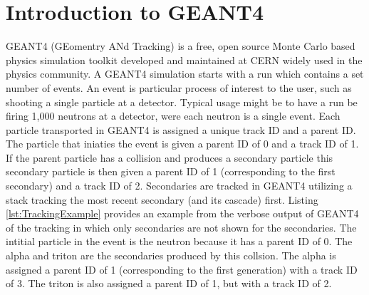 \section{Introduction to GEANT4}
\label{sec:G4Intro}

GEANT4 (GEomentry ANd Tracking) is a free, open source Monte Carlo based physics simulation toolkit developed and maintained at CERN widely used in the physics community.
A GEANT4 simulation starts with a run which contains a set number of events.
An event is particular process of interest to the user, such as shooting a single particle at a detector. 
Typical usage might be to have a run be firing 1,000 neutrons at a detector, were each neutron is a single event.
Each particle transported in GEANT4 is assigned a unique track ID and a parent ID.
The particle that iniaties the event is given a parent ID of 0 and a track ID of 1.
If the parent particle has a collision and produces a secondary particle this secondary particle is then given a parent ID of 1 (corresponding to the first secondary) and a track ID of 2.
Secondaries are tracked in GEANT4 utilizing a stack tracking the most recent secondary (and its cascade) first.
Listing \ref{lst:TrackingExample} provides an example from the verbose output of GEANT4 of the tracking in which only secondaries are not shown for the secondaries.
The intitial particle in the event is the neutron because it has a parent ID of 0.
The alpha and triton are the secondaries produced by this collsion. 
The alpha is assigned a parent ID of 1 (corresponding to the first generation) with a track ID of 3.
The triton is also assigned a parent ID of 1, but with a track ID of 2.
